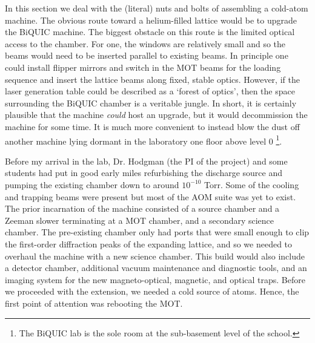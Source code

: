 	In this section we deal with the (literal) nuts and bolts of assembling a cold-atom machine.
	The obvious route toward a helium-filled lattice would be to upgrade the BiQUIC machine.
	The biggest obstacle on this route is the limited optical access to the chamber.
	For one, the windows are relatively small and so the beams would need to be inserted parallel to existing beams.
	In principle one could install flipper mirrors and switch in the MOT beams for the loading sequence and insert the lattice beams along fixed, stable optics.
	However, if the laser generation table could be described as a `forest of optics', then the space surrounding the BiQUIC chamber is a veritable jungle.
	In short, it is certainly plausible that the machine \emph{could} host an upgrade, but it would decommission the machine for some time.
	It is much more convenient to instead blow the dust off another machine lying dormant in the laboratory one floor above level 0 \footnote{The BiQUIC lab is the sole room at the sub-basement level of the school.}.

	Before my arrival in the lab, Dr. Hodgman (the PI of the project) and some students had put in good early miles refurbishing the discharge source and pumping the existing chamber down to around $10^{-10}$ Torr.
	Some of the cooling and trapping beams were present but most of the AOM suite was yet to exist.
	The prior incarnation of the machine consisted of a source chamber and a Zeeman slower terminating at a MOT chamber, and a secondary science chamber.
	The pre-existing chamber only had ports that were small enough to clip the first-order diffraction peaks of the expanding lattice, and so we needed to overhaul the machine 
	with a new science chamber.
	This build would also include a detector chamber, additional vacuum maintenance and diagnostic tools, and an imaging system for the new magneto-optical, magnetic, and optical traps.
	Before we proceeded with the extension, we needed a cold source of atoms. 
	Hence, the first point of attention was rebooting the MOT.

